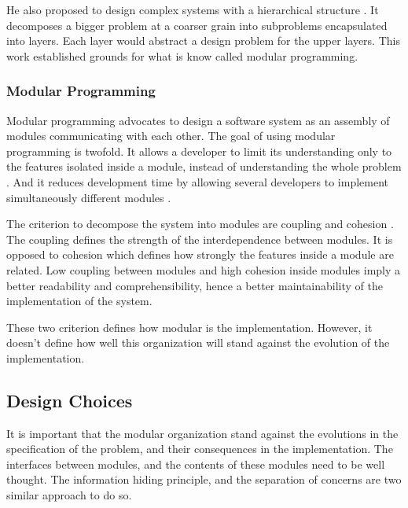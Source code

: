 He also proposed to design complex systems with a hierarchical structure \cite{Dijkstra1968}.
It decomposes a bigger problem at a coarser grain into subproblems encapsulated into layers.
Each layer would abstract a design problem for the upper layers.
This work established grounds for what is know called modular programming.


\subsubsection{Modular Programming}

Modular programming advocates to design a software system as an assembly of modules communicating with each other.
The goal of using modular programming is twofold.
It allows a developer to limit its understanding only to the features isolated inside a module, instead of understanding the whole problem \cite{Stevens1974}.
And it reduces development time by allowing several developers to implement simultaneously different modules \cite{Wong2009,Cataldo2006}.

The criterion to decompose the system into modules are coupling and cohesion \cite{Stevens1974}.
The coupling defines the strength of the interdependence between modules.
It is opposed to cohesion which defines how strongly the features inside a module are related.
Low coupling between modules and high cohesion inside modules imply a better readability and comprehensibility, hence a better maintainability of the implementation of the system.

These two criterion defines how modular is the implementation.
However, it doesn't define how well this organization will stand against the evolution of the implementation.



\subsection{Design Choices}

It is important that the modular organization stand against the evolutions in the specification of the problem, and their consequences in the implementation.
The interfaces between modules, and the contents of these modules need to be well thought.
The information hiding principle, and the separation of concerns are two similar approach to do so.

